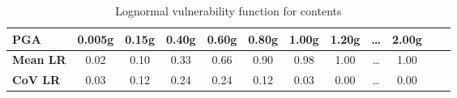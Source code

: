 \begin{table}[h]

\centering
\begin{tabular}{ l c c c c c c c c c c c}

\hline
\rowcolor{anti-flashwhite}
\bf{PGA} & \bf{0.005g} & \bf{0.15g} & \bf{0.40g} & \bf{0.60g} & \bf{0.80g} & \bf{1.00g} & \bf{1.20g} & \bf{\dots} & \bf{2.00g} \\
\hline
\bf{Mean LR} & 0.02 & 0.10 & 0.33 & 0.66 & 0.90 & 0.98 & 1.00 & \dots & 1.00 \\
\bf{CoV LR} & 0.03 & 0.12 & 0.24 & 0.24 & 0.12 & 0.03 & 0.00 & \dots & 0.00 \\
\hline
\end{tabular}

\caption{Lognormal vulnerability function for contents}
\label{tab:vf-ln-tax1-con}
\end{table}